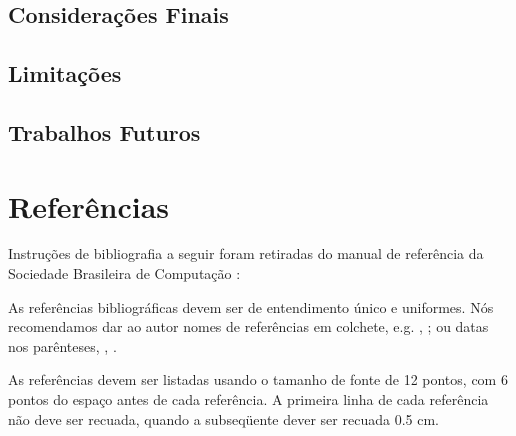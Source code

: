 \documentclass[a4paper, 12pt]{article}
\newcommand{\citeb}[1]{\bibleftbracket\cite{#1}\bibrightbracket}
\begin{document}
    \subsection{Considerações Finais}
    \lipsum[1-2]
    \subsection{Limitações}
    \lipsum[3-4]
    \subsection{Trabalhos Futuros}
    \lipsum[5-6]

    \clearpage

    \section*{Referências}
    Instruções de bibliografia a seguir foram retiradas do manual de referência
    da Sociedade Brasileira de Computação \citeb{sbc}:

    As referências bibliográficas devem ser de entendimento único e uniformes.
    Nós recomendamos dar ao autor nomes de referências em colchete, e.g.
    \citeb{knuth}, \citeb{smith};
    ou datas nos parênteses, \textcite{knuth}, \textcite{smith}.
    
    As referências devem ser listadas usando o tamanho de fonte de 12 pontos,
    com 6 pontos do espaço antes de cada referência.
    A primeira linha de cada referência não deve ser recuada,
    quando a subseqüente dever ser recuada 0.5 cm.
    \clearpage

    \nocite{*}

    \sectionfont{\raggedright}
    \printbibliography
    
\end{document}

